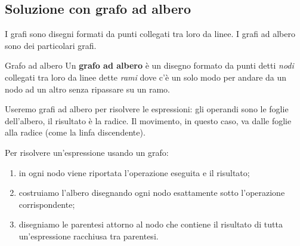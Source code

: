 \subsection{Soluzione con grafo ad albero}
I grafi sono disegni formati da punti collegati tra loro da linee. 
I grafi ad albero sono dei particolari grafi.

\begin{definizione}{Grafo ad albero}{}
Un \textbf{grafo ad albero} è un disegno formato da punti detti 
\emph{nodi} collegati tra loro da linee dette \emph{rami} dove c'è un 
solo modo per andare da un nodo ad un altro senza ripassare su un ramo.
\end{definizione}


Useremo grafi ad albero per risolvere le 
espressioni:
gli operandi sono le foglie dell'albero, il risultato è la radice. 
Il movimento, in questo caso, va dalle foglie alla radice (come la linfa 
discendente).

\begin{procedura}{}{}
Per risolvere un'espressione usando un grafo:
\begin{enumerate} [noitemsep]
\item in ogni nodo viene riportata l'operazione eseguita e il risultato;
\item costruiamo l'albero disegnando ogni nodo esattamente sotto
l'operazione corrispondente;
\item disegniamo le parentesi attorno al nodo che contiene il
risultato di tutta un'espressione racchiusa tra parentesi.
\end{enumerate}
\end{procedura}

